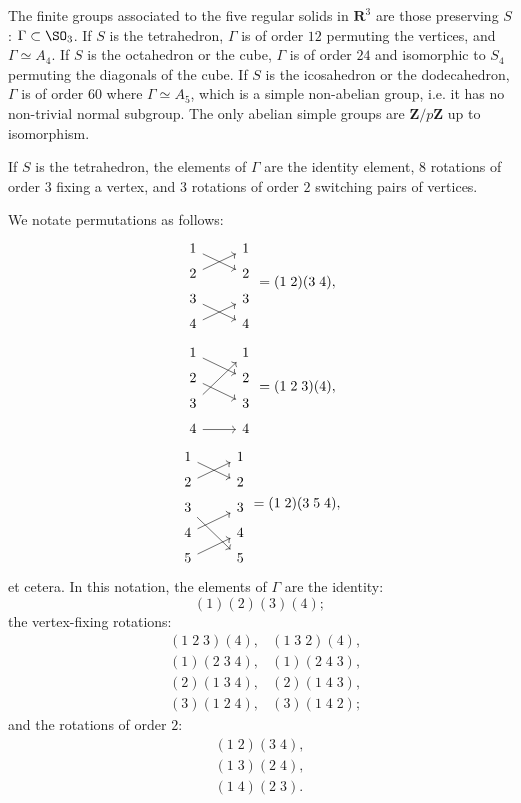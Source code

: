 \documentclass[11pt, oneside]{amsart}
\numberwithin{equation}{section}
\numberwithin{theorem}{section}
\theoremstyle{definition}
\def\Z{\mathbf{Z}}
\def\R{\mathbf{R}}
\begin{document}
{The finite groups associated to the five regular solids in $\R^3$ are those preserving $S$: $\Gamma\subset \SO_3$. If $S$ is the tetrahedron, $\Gamma $ is of order $12$ permuting the vertices, and $\Gamma\simeq A_4$. If $S$ is the octahedron or the cube, $\Gamma$ is of order $24$ and isomorphic to $S_4$ permuting the diagonals of the cube. If $S$ is the icosahedron or the dodecahedron, $\Gamma$ is of order $60$ where $\Gamma\simeq A_5$, which is a simple non-abelian group, i.e. it has no non-trivial normal subgroup. The only abelian simple groups are $\Z/p\Z$ up to isomorphism. 

If $S$ is the tetrahedron, the elements of $\Gamma$ are the identity element, $8$ rotations of order $3$ fixing a vertex, and $3$ rotations of order $2$ switching pairs of vertices. 

We notate permutations as follows:
\[
\begin{tikzcd}[row sep=tiny]
1 \arrow[rd]  & 1 \\ 2 \arrow[ru]& 2 \\ 3 \arrow[rd]& 3 \\ 4 \arrow[ru] & 4
\end{tikzcd} = (1\; 2)(3\; 4),\vspace*{8pt}
\]
\[
\begin{tikzcd}[row sep=tiny]
1 \arrow[rd]  & 1 \\ 2 \arrow[rd]& 2 \\ 3 \arrow[ruu]& 3 \\ 4 \arrow[r] & 4
\end{tikzcd} = (1\; 2\; 3)(4),\vspace*{8pt}
\]
\[
\begin{tikzcd}[row sep=tiny]
1 \arrow[rd]  & 1 \\ 2 \arrow[ru]& 2 \\ 3 \arrow[rdd]& 3 \\ 4 \arrow[ru] & 4\\5\arrow[ru] & 5
\end{tikzcd} = (1\; 2)(3\;5\;4),
\]
et cetera. In this notation, the elements of $\Gamma$ are the identity:
$$
(1)(2)(3)(4);
$$
the vertex-fixing rotations:
\begin{align*}
&(1\;2\;3)(4),&(1\;3\;2)(4),\\
&(1)(2\;3\;4),&(1)(2\;4\;3),\\
&(2)(1\;3\;4),&(2)(1\;4\;3),\\
&(3)(1\;2\;4),&(3)(1\;4\;2);
\end{align*}
and the rotations of order $2$:
\begin{align*}
(1\;2)(3\;4),\\
(1\;3)(2\;4),\\
(1\;4)(2\;3).
\end{align*}

}
\end{document}

